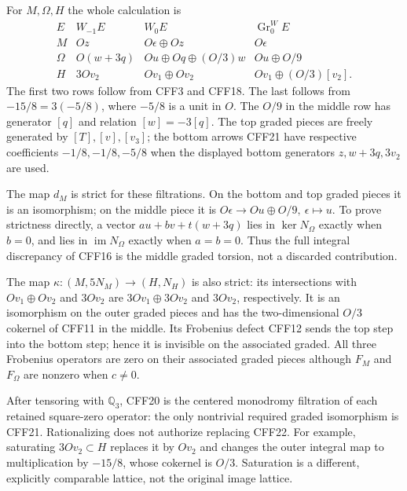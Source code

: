 \documentclass[11pt]{article}
\newcommand{\KK}{\mathbb Q_3}
\newcommand{\im}{\operatorname{im}}
\begin{document}
For \(M,\Omega,H\) the whole calculation is
\[
\begin{array}{c|c|c|c}
 E&W_{-1}E&W_0E&\operatorname{Gr}^W_0E\\ \hline
 M&Oz&O\epsilon\oplus Oz&O\epsilon\\
 \Omega&O(w+3q)&Ou\oplus Oq\oplus(O/3)w&Ou\oplus O/9\\
 H&3Ov_2&Ov_1\oplus Ov_2&Ov_1\oplus(O/3)[v_2].
\end{array}
 \tag{CFF22}
\]
The first two rows follow from CFF3 and CFF18. The last follows
from \(-15/8=3(-5/8)\), where \(-5/8\) is a unit in \(O\).
The \(O/9\) in the middle row has generator \([q]\) and relation
\([w]=-3[q]\). The top graded pieces are freely generated by
\([T],[v],[v_3]\); the bottom arrows CFF21 have respective
coefficients \(-1/8,-1/8,-5/8\) when the displayed bottom
generators \(z,w+3q,3v_2\) are used.

The map \(d_M\) is strict for these filtrations. On the bottom
and top graded pieces it is an isomorphism; on the middle piece
it is \(O\epsilon\to Ou\oplus O/9,\ \epsilon\mapsto u\).
To prove strictness directly, a vector \(a u+b v+t(w+3q)\)
lies in \(\ker N_\Omega\) exactly when \(b=0\), and lies in
\(\im N_\Omega\) exactly when \(a=b=0\).
Thus the full integral discrepancy of CFF16 is the middle
graded torsion, not a discarded contribution.

The map \(\kappa:(M,5N_M)\to(H,N_H)\) is also strict:
its intersections with \(Ov_1\oplus Ov_2\) and \(3Ov_2\)
are \(3Ov_1\oplus3Ov_2\) and \(3Ov_2\), respectively.
It is an isomorphism on the outer graded pieces and has the
two-dimensional \(O/3\) cokernel of CFF11 in the middle.
Its Frobenius defect CFF12 sends the top step into the bottom
step; hence it is invisible on the associated graded. All
three Frobenius operators are zero on their associated graded
pieces although \(F_M\) and \(F_\Omega\) are nonzero when \(c\ne0\).

After tensoring with \(\KK\), CFF20 is the centered monodromy
filtration of each retained square-zero operator: the only
nontrivial required graded isomorphism is CFF21. Rationalizing
does not authorize replacing CFF22. For example, saturating
\(3Ov_2\subset H\) replaces it by \(Ov_2\) and changes the
outer integral map to multiplication by \(-15/8\), whose
cokernel is \(O/3\). Saturation is a different, explicitly
comparable lattice, not the original image lattice.
\end{document}
